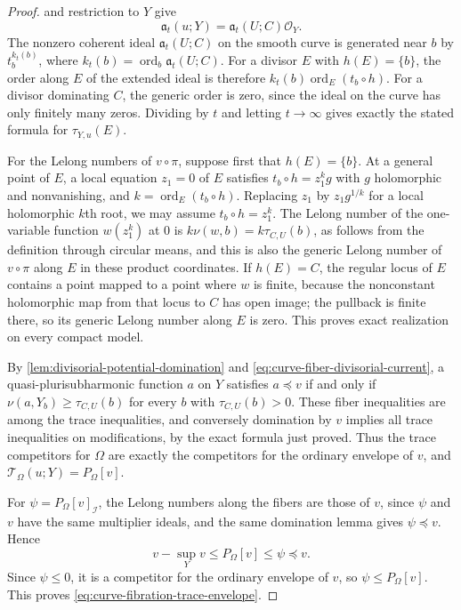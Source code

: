 \begin{proof}
 and restriction to $Y$ give
\[
 \mathfrak a_t(u;Y)=\mathfrak a_t(U;C)\mathcal O_Y.
\]
The nonzero coherent ideal $\mathfrak a_t(U;C)$ on the smooth curve is generated near $b$ by $t_b^{k_t(b)}$, where $k_t(b)=\operatorname{ord}_b\mathfrak a_t(U;C)$. For a divisor $E$ with $h(E)=\{b\}$, the order along $E$ of the extended ideal is therefore $k_t(b)\operatorname{ord}_E(t_b\circ h)$. For a divisor dominating $C$, the generic order is zero, since the ideal on the curve has only finitely many zeros. Dividing by $t$ and letting $t\to\infty$ gives exactly the stated formula for $\tau_{Y,u}(E)$.

For the Lelong numbers of $v\circ\pi$, suppose first that $h(E)=\{b\}$. At a general point of $E$, a local equation $z_1=0$ of $E$ satisfies $t_b\circ h=z_1^k g$ with $g$ holomorphic and nonvanishing, and $k=\operatorname{ord}_E(t_b\circ h)$. Replacing $z_1$ by $z_1g^{1/k}$ for a local holomorphic $k$th root, we may assume $t_b\circ h=z_1^k$. The Lelong number of the one-variable function $w(z_1^k)$ at $0$ is $k\nu(w,b)=k\tau_{C,U}(b)$, as follows from the definition through circular means, and this is also the generic Lelong number of $v\circ\pi$ along $E$ in these product coordinates. If $h(E)=C$, the regular locus of $E$ contains a point mapped to a point where $w$ is finite, because the nonconstant holomorphic map from that locus to $C$ has open image; the pullback is finite there, so its generic Lelong number along $E$ is zero. This proves exact realization on every compact model.

By \cref{lem:divisorial-potential-domination} and \eqref{eq:curve-fiber-divisorial-current}, a quasi-plurisubharmonic function $a$ on $Y$ satisfies $a\preceq v$ if and only if $\nu(a,Y_b)\geq\tau_{C,U}(b)$ for every $b$ with $\tau_{C,U}(b)>0$. These fiber inequalities are among the trace inequalities, and conversely domination by $v$ implies all trace inequalities on modifications, by the exact formula just proved. Thus the trace competitors for $\Omega$ are exactly the competitors for the ordinary envelope of $v$, and $\mathcal T_\Omega(u;Y)=P_\Omega[v]$.

For $\psi=P_\Omega[v]_{\mathcal I}$, the Lelong numbers along the fibers are those of $v$, since $\psi$ and $v$ have the same multiplier ideals, and the same domination lemma gives $\psi\preceq v$. Hence
\[
 v-\sup_Yv\leq P_\Omega[v]\leq\psi\preceq v.
\]
Since $\psi\leq0$, it is a competitor for the ordinary envelope of $v$, so $\psi\leq P_\Omega[v]$. This proves \eqref{eq:curve-fibration-trace-envelope}.


\end{proof}
